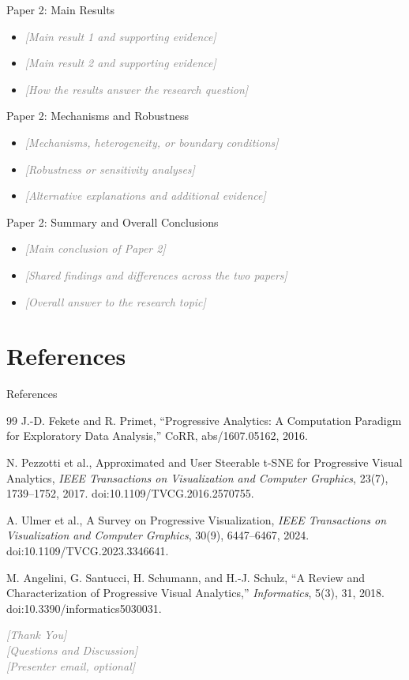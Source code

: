 \documentclass[aspectratio=169]{beamer}
\newcommand{\fillin}[1]{\textcolor{gray}{\textit{[#1]}}}
\begin{document}
\begin{frame}{Paper 2: Main Results}
  \begin{itemize}
    \item \fillin{Main result 1 and supporting evidence}
    \item \fillin{Main result 2 and supporting evidence}
    \item \fillin{How the results answer the research question}
  \end{itemize}
\end{frame}

\begin{frame}{Paper 2: Mechanisms and Robustness}
  \begin{itemize}
    \item \fillin{Mechanisms, heterogeneity, or boundary conditions}
    \item \fillin{Robustness or sensitivity analyses}
    \item \fillin{Alternative explanations and additional evidence}
  \end{itemize}
\end{frame}

\begin{frame}{Paper 2: Summary and Overall Conclusions}
  \begin{itemize}
    \item \fillin{Main conclusion of Paper 2}
    \item \fillin{Shared findings and differences across the two papers}
    \item \fillin{Overall answer to the research topic}
  \end{itemize}
\end{frame}

\section{References}
\begin{frame}{References}
  \small
  \begin{thebibliography}{99}
     J.-D. Fekete and R. Primet, ``Progressive Analytics: A Computation Paradigm for Exploratory Data Analysis,'' CoRR, abs/1607.05162, 2016.

     N. Pezzotti et al., Approximated and User Steerable t-SNE for Progressive Visual Analytics, \textit{IEEE Transactions on Visualization and Computer Graphics}, 23(7), 1739--1752, 2017. doi:10.1109/TVCG.2016.2570755.

     A. Ulmer et al., A Survey on Progressive Visualization, \textit{IEEE Transactions on Visualization and Computer Graphics}, 30(9), 6447--6467, 2024. doi:10.1109/TVCG.2023.3346641.

     M. Angelini, G. Santucci, H. Schumann, and H.-J. Schulz, ``A Review and Characterization of Progressive Visual Analytics,'' \textit{Informatics}, 5(3), 31, 2018. doi:10.3390/informatics5030031.
\end{thebibliography}
\end{frame}

\begin{frame}
  \centering
  \vfill
  {\LARGE \fillin{Thank You}}\\[1em]
  {\large \fillin{Questions and Discussion}}\\[2em]
  \fillin{Presenter email, optional}
  \vfill
\end{frame}
\end{document}
